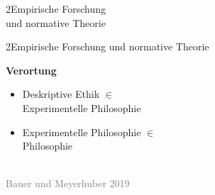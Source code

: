 \documentclass[xcolor=table,9pt,aspectratio=169]{beamer}
\begin{document}
\begin{frame}
\begin{overlayarea}{\textwidth}{0.81\paperheight}{
   \vspace*{11mm}
   \textcolor{uolblue}
   {2\hspace*{1em}Empirische Forschung\\\hspace*{1.5em}und normative Theorie}
}
\end{overlayarea}
\end{frame}


\begin{frame}{\vspace*{10mm}2\hspace*{1em}Empirische Forschung und normative Theorie}
\begin{multicols}{2}
   \textbf{Verortung}\\
   \medskip
   \begin{itemize}
      \item Deskriptive Ethik $\in$\\Experimentelle Philosophie
      \item Experimentelle Philosophie $\in$\\Philosophie
   \end{itemize}
   \vfill
   \begin{center}
      \\
      \textcolor{gray}{Bauer und Meyerhuber 2019}
   \end{center}
\end{multicols}
\end{frame}
\end{document}
